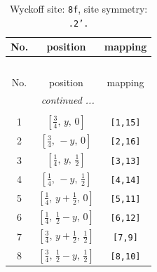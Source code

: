 \documentclass[fleqn,8pt]{jsarticle}
\begin{document}
\begin{longtable}{ccc}
\caption{Wyckoff site: {\tt 8f}, site symmetry: {\tt .2'.}}
 \\
 \hline \hline
No. & position & mapping \\ \hline \endfirsthead

\multicolumn{2}{l}{\tablename\ \thetable{}} \\
 \hline \hline
No. & position & mapping \\ \hline \endhead

 \hline \hline
\multicolumn{2}{r}{\footnotesize\it continued ...} \\ \endfoot

 \hline \hline
\multicolumn{2}{r}{} \\ \endlastfoot

1 & $\left[ \frac{3}{4},\, y,\, 0 \right]$ & {\tt [1,15]} \\ \hline
2 & $\left[ \frac{3}{4},\, - y,\, 0 \right]$ & {\tt [2,16]} \\ \hline
3 & $\left[ \frac{1}{4},\, y,\, \frac{1}{2} \right]$ & {\tt [3,13]} \\ \hline
4 & $\left[ \frac{1}{4},\, - y,\, \frac{1}{2} \right]$ & {\tt [4,14]} \\ \hline
5 & $\left[ \frac{1}{4},\, y + \frac{1}{2},\, 0 \right]$ & {\tt [5,11]} \\ \hline
6 & $\left[ \frac{1}{4},\, \frac{1}{2} - y,\, 0 \right]$ & {\tt [6,12]} \\ \hline
7 & $\left[ \frac{3}{4},\, y + \frac{1}{2},\, \frac{1}{2} \right]$ & {\tt [7,9]} \\ \hline
8 & $\left[ \frac{3}{4},\, \frac{1}{2} - y,\, \frac{1}{2} \right]$ & {\tt [8,10]} \\
\end{longtable}
\renewcommand{\arraystretch}{1.2}
\end{document}
